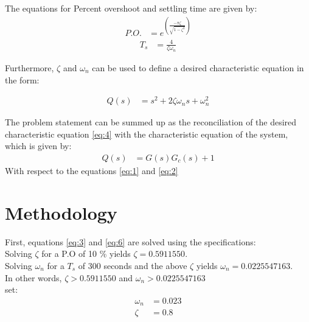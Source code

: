 The equations for Percent overshoot and settling time are given by:
\begin{align} \label{eq:3}
P.O. &= e^{\left( \frac{-\pi\zeta}{\sqrt{1-\zeta^2}}\right)}
\end{align}
\begin{align}\label{eq:6}
T_s &= \frac{4}{\zeta\omega_n}
\end{align}

Furthermore, $\zeta$ and $\omega_n$ can be used to define a desired characteristic equation in the form:

\begin{align} \label{eq:4}
Q(s) &= s^2 + 2\zeta\omega_ns + \omega_n^2
\end{align}

The problem statement can be summed up as the reconciliation of the desired characteristic equation \ref{eq:4} with the characteristic equation of the system, which is given by:
\begin{align}\label{eq:5}
Q(s) &= G(s)G_c(s) + 1 
\end{align}
With respect to the equations \ref{eq:1} and \ref{eq:2}








\chapter{Methodology}
First, equations \ref{eq:3} and \ref{eq:6} are solved using the specifications:\\
Solving $\zeta$ for a P.O of 10 \% yields $\zeta = 0.5911550.$\\
Solving $\omega_n$ for a $T_s$ of 300 seconds and the above $\zeta$ yields $\omega_n = 0.0225547163$.\\
In other words, $\zeta > 0.5911550 $ and $\omega_n > 0.0225547163$\\
set:
\begin{align}
\omega_n &= 0.023\\
\zeta &= 0.8 
\end{align}









